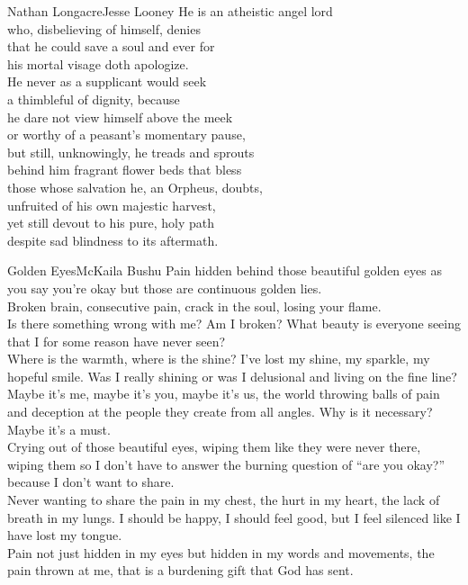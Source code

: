 
\begin{poetry}{Nathan Longacre}{Jesse Looney}
He is an atheistic angel lord\\
who, disbelieving of himself, denies\\
that he could save a soul and ever for\\
his mortal visage doth apologize.\\
He never as a supplicant would seek\\
a thimbleful of dignity, because\\
he dare not view himself above the meek\\
or worthy of a peasant's momentary pause,\\
but still, unknowingly, he treads and sprouts\\
behind him fragrant flower beds that bless\\
those whose salvation he, an Orpheus, doubts,\\
unfruited of his own majestic harvest,\\
yet still devout to his pure, holy path\\
despite sad blindness to its aftermath.
\end{poetry}

\begin{poetry}{Golden Eyes}{McKaila Bushu}
Pain hidden behind those beautiful golden eyes as you say you're okay but those are continuous golden lies.\\
Broken brain, consecutive pain, crack in the soul, losing your flame.\\
Is there something wrong with me? Am I broken? What beauty is everyone seeing that I for some reason have never seen?\\
Where is the warmth, where is the shine? I've lost my shine, my sparkle, my hopeful smile. Was I really shining or was I delusional and living on the fine line?\\
Maybe it's me, maybe it's you, maybe it's us, the world throwing balls of pain and deception at the people they create from all angles. Why is it necessary? Maybe it's a must.\\
Crying out of those beautiful eyes, wiping them like they were never there, wiping them so I don't have to answer the burning question of “are you okay?” because I don't want to share.\\
Never wanting to share the pain in my chest, the hurt in my heart, the lack of breath in my lungs. I should be happy, I should feel good, but I feel silenced like I have lost my tongue.\\
Pain not just hidden in my eyes but hidden in my words and movements, the pain thrown at me, that is a burdening gift that God has sent.
\end{poetry}

